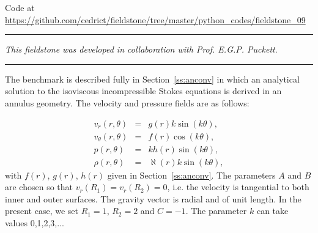 

\begin{center}
Code at \url{https://github.com/cedrict/fieldstone/tree/master/python_codes/fieldstone_09}
\end{center}

\par\noindent\rule{\textwidth}{0.4pt}

{\sl This fieldstone was developed in collaboration with Prof. E.G.P. Puckett}. 

\par\noindent\rule{\textwidth}{0.4pt}

The benchmark is described fully in Section~\ref{ss:anconv} in which 
an analytical solution to the isoviscous incompressible Stokes equations 
is derived in an annulus geometry.
The velocity and pressure fields are as follows:

\begin{eqnarray}
v_r(r,\theta)     &=&  g(r) k \sin(k\theta), \\
v_\theta(r,\theta)&=&  f(r) \cos(k \theta), \\ 
p(r,\theta)       &=&  k h(r) \sin(k \theta), \\
\rho (r,\theta)   &=& \aleph(r) k \sin (k \theta), 
\end{eqnarray}
with $f(r)$, $g(r)$, $h(r)$ given in Section~\ref{ss:anconv}.
The parameters $A$ and $B$ are chosen so that $v_r(R_1)=v_r(R_2)=0$, i.e.
the velocity is tangential to both inner and outer surfaces.
The gravity vector is radial and of unit length.
In the present case, we set $R_1=1$, $R_2=2$ and $C=-1$.
The parameter $k$ can take values 0,1,2,3,... 

